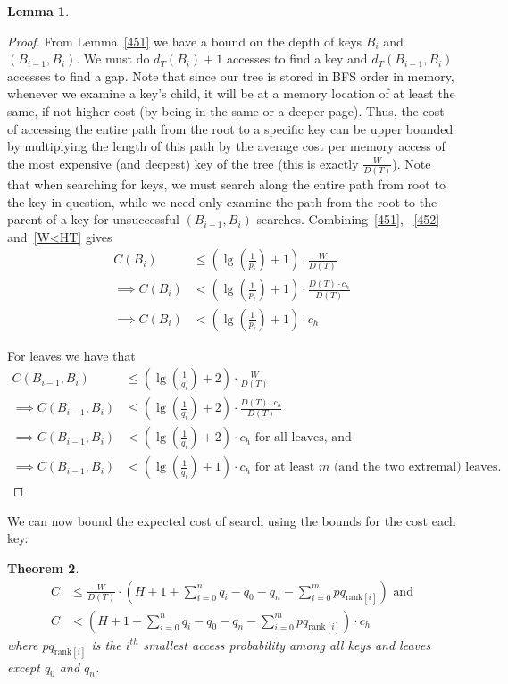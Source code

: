 \documentclass[]{beamer}
\theoremstyle{plain}
\newtheorem{thm}{Theorem}[section]
\newtheorem{lem}[thm]{Lemma}
\begin{document}
\begin{frame}
\begin{lem}
\end{lem}

\begin{proof}
From Lemma~\ref{451} we have a bound on the depth of keys $B_i$ and $(B_{i-1},B_i)$. We must do $d_T(B_i) + 1$ accesses to find a key and $d_T(B_{i-1},B_i)$ accesses to find a gap. Note that since our tree is stored in BFS order in memory, whenever we examine a key's child, it will be at a memory location of at least the same, if not higher cost (by being in the same or a deeper page). Thus, the cost of accessing the entire path from the root to a specific key can be upper bounded by multiplying the length of this path by the average cost per memory access of the most expensive (and deepest) key of the tree (this is exactly $\frac{W}{D(T)}$). Note that when searching for keys, we must search along the entire path from root to the key in question, while we need only examine the path from the root to the parent of a key for unsuccessful $(B_{i-1},B_i)$ searches. Combining~\ref{451}, ~\ref{452} and~\ref{W<HT} gives
\begin{align*}
C(B_i) &\leq (\lg(\frac{1}{p_i})+1)\cdot\frac{W}{D(T)}\\
\implies C(B_i) &< (\lg(\frac{1}{p_i})+1)\cdot\frac{D(T)\cdot c_h}{D(T)}   \\
\implies C(B_i) &< (\lg(\frac{1}{p_i})+1)\cdot c_h
\end{align*}

For leaves we have that
\begin{align*}
C(B_{i-1},B_i) &\leq (\lg(\frac{1}{q_i})+2)\cdot \frac{W}{D(T)}   \\
\implies C(B_{i-1},B_i) &\leq (\lg(\frac{1}{q_i})+2)\cdot \frac{D(T)\cdot c_h}{D(T)}   \\
\implies C(B_{i-1},B_i) &< (\lg(\frac{1}{q_i})+2)\cdot c_h \text{ for all leaves, and} \\
\implies C(B_{i-1},B_i) &< (\lg(\frac{1}{q_i})+1)\cdot c_h \text{ for at least $m$ (and the two extremal) leaves}.
\end{align*}
\end{proof}

We can now bound the expected cost of search using the bounds for the cost each key.

\begin{thm} \label{ApproxMWPagingThm}
\begin{align*}
C &\leq  \frac{W}{D(T)} \cdot  \left(H + 1 + \sum_{i=0}^n q_i - q_0 - q_n - \sum_{i=0}^m pq_{\text{rank}[i]} \right) \text{ and}\\
C &< \left(H + 1 + \sum_{i=0}^n q_i - q_0 - q_n - \sum_{i=0}^m pq_{\text{rank}[i]} \right) \cdot  c_h
\end{align*}
where $pq_{\text{rank}[i]}$ is the $i^{th}$ smallest access probability among all keys and leaves except $q_0$ and $q_n$.
\end{thm}


\end{frame}
\end{document}
